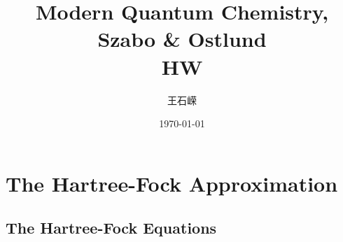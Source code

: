 \documentclass[a4paper]{article}
\title{\textbf{Modern Quantum Chemistry, Szabo \& Ostlund}\\HW}
\author{王石嵘
\vspace{5pt}\\
}
\date{\today} %
\numberwithin{equation}{subsection}
\begin{document}

\maketitle

\tableofcontents

\newpage

\setcounter{section}{2}
\section{The Hartree-Fock Approximation}
\subsection{The Hartree-Fock Equations}
\end{document}
